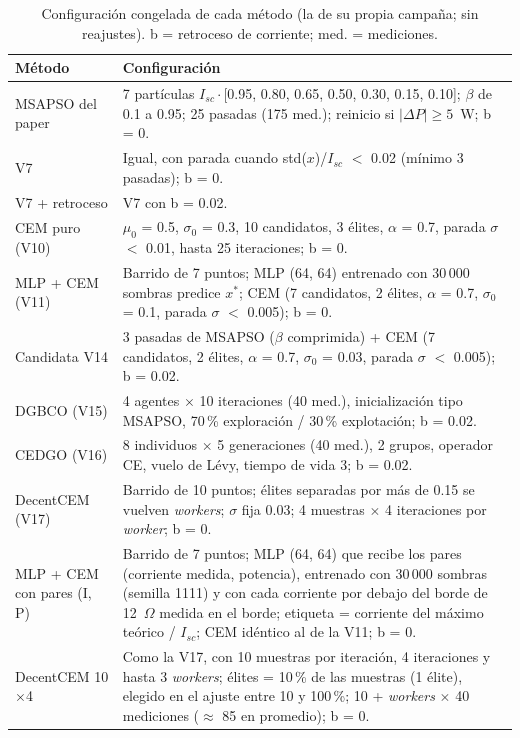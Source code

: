 \documentclass[letterpaper,11pt]{article}
\begin{document}
\begin{table}[H]
  \centering
  \caption{Configuración congelada de cada método (la de su propia campaña; sin reajustes). b = retroceso de corriente; med. = mediciones.}
  \label{tab:config}
  \footnotesize
  \begin{tabularx}{\linewidth}{@{}p{3.0cm}L@{}}
    \toprule
    \textbf{Método} & \textbf{Configuración} \\
    \midrule
    MSAPSO del paper & 7 partículas $I_{sc}\cdot$[0.95, 0.80, 0.65, 0.50, 0.30, 0.15, 0.10]; $\beta$ de 0.1 a 0.95; 25 pasadas (175 med.); reinicio si $|\Delta P| \geq 5$~W; b = 0. \\
    V7 & Igual, con parada cuando std($x$)/$I_{sc}$ $<$ 0.02 (mínimo 3 pasadas); b = 0. \\
    V7 + retroceso & V7 con b = 0.02. \\
    CEM puro (V10) & $\mu_0$ = 0.5, $\sigma_0$ = 0.3, 10 candidatos, 3 élites, $\alpha$ = 0.7, parada $\sigma$ $<$ 0.01, hasta 25 iteraciones; b = 0. \\
    MLP + CEM (V11) & Barrido de 7 puntos; MLP (64, 64) entrenado con 30\,000 sombras predice $x^*$; CEM (7 candidatos, 2 élites, $\alpha$ = 0.7, $\sigma_0$ = 0.1, parada $\sigma$ $<$ 0.005); b = 0. \\
    Candidata V14 & 3 pasadas de MSAPSO ($\beta$ comprimida) + CEM (7 candidatos, 2 élites, $\alpha$ = 0.7, $\sigma_0$ = 0.03, parada $\sigma$ $<$ 0.005); b = 0.02. \\
    DGBCO (V15) & 4 agentes $\times$ 10 iteraciones (40 med.), inicialización tipo MSAPSO, 70\,\% exploración / 30\,\% explotación; b = 0.02. \\
    CEDGO (V16) & 8 individuos $\times$ 5 generaciones (40 med.), 2 grupos, operador CE, vuelo de Lévy, tiempo de vida 3; b = 0.02. \\
    DecentCEM (V17) & Barrido de 10 puntos; élites separadas por más de 0.15 se vuelven \textit{workers}; $\sigma$ fija 0.03; 4 muestras $\times$ 4 iteraciones por \textit{worker}; b = 0. \\
    MLP + CEM con pares (I, P) & Barrido de 7 puntos; MLP (64, 64) que recibe los pares (corriente medida, potencia), entrenado con 30\,000 sombras (semilla 1111) y con cada corriente por debajo del borde de 12~$\Omega$ medida en el borde; etiqueta = corriente del máximo teórico / $I_{sc}$; CEM idéntico al de la V11; b = 0. \\
    DecentCEM 10$\times$4 & Como la V17, con 10 muestras por iteración, 4 iteraciones y hasta 3 \textit{workers}; élites = 10\,\% de las muestras (1 élite), elegido en el ajuste entre 10 y 100\,\%; 10 + \textit{workers} $\times$ 40 mediciones ($\approx$ 85 en promedio); b = 0. \\
    \bottomrule
  \end{tabularx}
\end{table}
\end{document}

